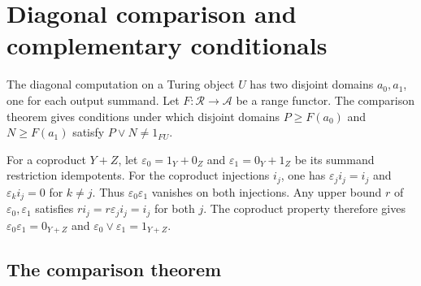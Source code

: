 \section{Diagonal comparison and complementary conditionals}\label{sec:lifting}

The diagonal computation on a Turing object $U$ has two disjoint
domains $a_0,a_1$, one for each output summand. Let $F:\mathscr R\to\mathcal A$
be a range functor. The comparison theorem gives conditions under which
disjoint domains $P\geq F(a_0)$ and $N\geq F(a_1)$ satisfy
$P\vee N\ne1_{FU}$.

For a coproduct $Y+Z$, let
$\varepsilon_0=1_Y+0_Z$ and $\varepsilon_1=0_Y+1_Z$ be its summand
restriction idempotents. For the coproduct injections $i_j$, one has
$\varepsilon_j i_j=i_j$ and $\varepsilon_k i_j=0$ for $k\ne j$.
Thus $\varepsilon_0\varepsilon_1$ vanishes on both injections.
Any upper bound $r$ of $\varepsilon_0,\varepsilon_1$ satisfies
$r i_j=r\varepsilon_j i_j=i_j$ for both $j$. The coproduct property
therefore gives $\varepsilon_0\varepsilon_1=0_{Y+Z}$ and
$\varepsilon_0\vee\varepsilon_1=1_{Y+Z}$.

\subsection{The comparison theorem}


